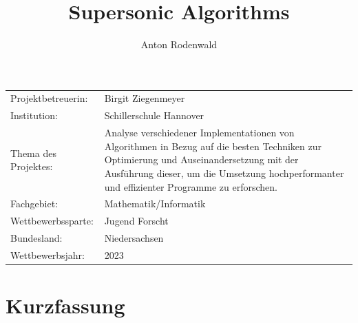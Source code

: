 \documentclass[11pt,a4paper]{article}
\begin{document}
\title{Supersonic Algorithms}
\author{Anton Rodenwald}

\maketitle

\large\begin{tabular}{l p{12cm}}

    Projektbetreuerin: & Birgit Ziegenmeyer \\

    Institution: & Schillerschule Hannover \\
    
    Thema des Projektes: 
    & Analyse verschiedener Implementationen von Algorithmen 
    in Bezug auf die besten Techniken zur Optimierung 
    und Auseinandersetzung mit der Ausführung dieser,
    um die Umsetzung hochperformanter und effizienter
    Programme zu erforschen. \\

    Fachgebiet: & Mathematik/Informatik \\

    Wettbewerbssparte: & Jugend Forscht \\
    
    Bundesland: & Niedersachsen \\
    
    Wettbewerbsjahr: & 2023 \\
    
\end{tabular}

\clearpage

\section*{Kurzfassung}
\end{document}
